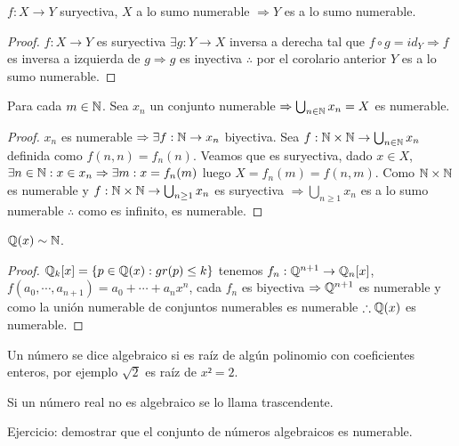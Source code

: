\begin{theorem}
    $f: X \to Y$ suryectiva, $X$ a lo sumo numerable $\Rightarrow Y$ es a lo sumo numerable.
    \begin{proof}
        $f: X \to Y$ es suryectiva $\exists g: Y \to X$ inversa a derecha tal que $f \circ g = id_Y \Rightarrow f$ es inversa a izquierda de $g \Rightarrow g$ es inyectiva $\therefore$ por el corolario anterior $Y$ es a lo sumo numerable.
    \end{proof}
\end{theorem}

\begin{theorem}
    Para cada $m \in \mathbb{N}$. Sea $x_n$ un conjunto numerable $\Rightarrow \bigcup_{n \in \mathbb{N}}x_n = X$ es numerable.
    \begin{proof}
        $x_n$ es numerable $\Rightarrow \exists f:\mathbb{N} \to x_n$ biyectiva. Sea $f:\mathbb{N} \times \mathbb{N} \to \bigcup_{n \in \mathbb{N}} x_n $ definida como $f(n, n) = f_n(n)$. Veamos que es suryectiva, dado $x \in X$, $\exists n \in \mathbb{N}:x \in x_n \Rightarrow \exists m:x=f_n(m)$ luego $X=f_n(m) = f(n, m)$. Como $\mathbb{N} \times \mathbb{N}$ es numerable y $f: \mathbb{N} \times \mathbb{N} \to \bigcup_{n \geq 1}{x_n}$ es suryectiva $\Rightarrow \bigcup_{n \geq 1}x_n$ es a lo sumo numerable $\therefore$ como es infinito, es numerable.
    \end{proof}
\end{theorem}

\begin{eg}
    $\mathbb{Q}(x) \sim \mathbb{N}$.
    \begin{proof}
        $\mathbb{Q}_k[x] = \{ p \in \mathbb{Q}(x) : gr(p) \leq k \}$ tenemos $f_n : \mathbb{Q}^{n+1} \to \mathbb{Q}_n[x]$, $f(a_0, \cdots, a_{n+1}) = a_0 + \cdots + a_nx^n$, cada $f_n$ es biyectiva $\Rightarrow \mathbb{Q}^{n+1}$ es numerable y como la unión numerable de conjuntos numerables es numerable $\therefore \mathbb{Q}(x)$ es numerable.
    \end{proof}
\end{eg}

\begin{definition}
    Un número se dice algebraico si es raíz de algún polinomio con coeficientes enteros, por ejemplo $\sqrt{2}$ es raíz de $x² = 2$.
\end{definition}

\begin{definition}
    Si un número real no es algebraico se lo llama trascendente.
\end{definition}

Ejercicio: demostrar que el conjunto de números algebraicos es numerable.
